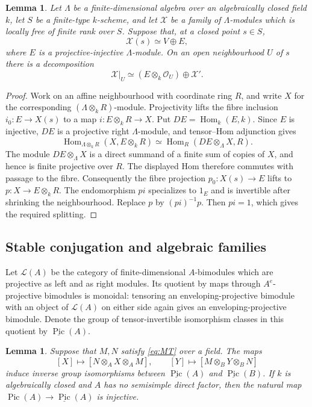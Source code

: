\documentclass[12pt,a4paper,english,reqno]{amsart}
\numberwithin{equation}{section}
\theoremstyle{plain}
\newtheorem{lemma}[theorem]{Lemma}
\theoremstyle{definition}
\begin{document}
\begin{lemma}\label{out:local-pi-splitting}
Let $\Lambda$ be a finite-dimensional algebra over an algebraically
closed field $k$, let $S$ be a finite-type $k$-scheme, and let $\mathcal X$ be a
family of $\Lambda$-modules which is locally free of finite rank
over $S$. Suppose that, at a closed point $s\in S$,
\[
 \mathcal X(s)\simeq V\oplus E,
\]
where $E$ is a projective-injective $\Lambda$-module. On an open
neighbourhood $U$ of $s$ there is a decomposition
\[
 \mathcal X|_U\simeq(E\otimes_k\mathcal O_U)\oplus\mathcal X'.
\]
\end{lemma}

\begin{proof}
Work on an affine neighbourhood with coordinate ring $R$, and
write $X$ for the corresponding $(\Lambda\otimes_kR)$-module.
Projectivity lifts the fibre inclusion $i_0:E\to X(s)$ to a map
$i:E\otimes_kR\to X$. Put $DE=\operatorname{Hom}_k(E,k)$.
Since $E$ is injective, $DE$ is a projective right $\Lambda$-module,
and tensor--Hom adjunction gives
\[
 \operatorname{Hom}_{\Lambda\otimes_kR}(X,E\otimes_kR)
 \simeq\operatorname{Hom}_R(DE\otimes_\Lambda X,R).
\]
The module $DE\otimes_\Lambda X$ is a direct summand of a finite
sum of copies of $X$, and hence is finite projective over $R$.
The displayed Hom therefore commutes with passage to the fibre.
Consequently the fibre projection $p_0:X(s)\to E$ lifts to
$p:X\to E\otimes_kR$. The endomorphism $pi$ specializes to
$1_E$ and is invertible after shrinking the neighbourhood.
Replace $p$ by $(pi)^{-1}p$. Then $pi=1$, which gives the required
splitting.
\end{proof}

\subsection{Stable conjugation and algebraic families}

Let $\mathcal L(A)$ be the category of finite-dimensional
$A$-bimodules which are projective as left and as right modules.
Its quotient by maps through $A^e$-projective bimodules is monoidal:
tensoring an enveloping-projective bimodule with an object of
$\mathcal L(A)$ on either side again gives an enveloping-projective
bimodule. Denote the group of tensor-invertible isomorphism classes
in this quotient by $\underline{\operatorname{Pic}}(A)$.

\begin{lemma}\label{out:stable-conjugation}
Suppose that $M,N$ satisfy \eqref{eq:MT} over a field. The maps
\[
 [X]\longmapsto[N\otimes_AX\otimes_AM],\qquad
 [Y]\longmapsto[M\otimes_BY\otimes_BN]
\]
induce inverse group isomorphisms between
$\underline{\operatorname{Pic}}(A)$ and
$\underline{\operatorname{Pic}}(B)$.
If $k$ is algebraically closed and $A$ has no semisimple direct
factor, then the natural map
$\operatorname{Pic}(A)\to\underline{\operatorname{Pic}}(A)$ is
injective.
\end{lemma}
\end{document}

